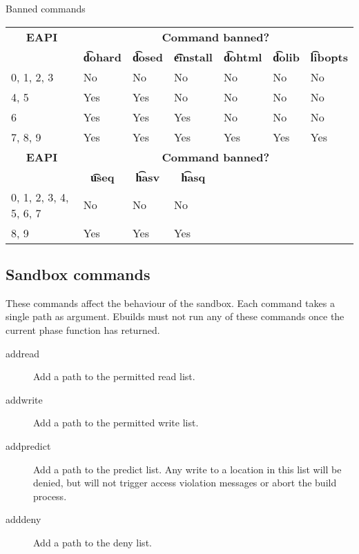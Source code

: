 \begin{centertable}{Banned commands}
    \label{tab:banned-commands-table}
    \begin{tabular}{lllllll}
      \toprule
      \multicolumn{1}{c}{\textbf{EAPI}} &
      \multicolumn{6}{c}{\textbf{Command banned?}} \\
      \multicolumn{1}{c}{} &
      \multicolumn{1}{c}{\textbf{\t{dohard}}} &
      \multicolumn{1}{c}{\textbf{\t{dosed}}} &
      \multicolumn{1}{c}{\textbf{\t{einstall}}} &
      \multicolumn{1}{c}{\textbf{\t{dohtml}}} &
      \multicolumn{1}{c}{\textbf{\t{dolib}}} &
      \multicolumn{1}{c}{\textbf{\t{libopts}}} \\
      \midrule
      0, 1, 2, 3        & No  & No  & No  & No  & No  & No  \\
      4, 5              & Yes & Yes & No  & No  & No  & No  \\
      6                 & Yes & Yes & Yes & No  & No  & No  \\
      7, 8, 9           & Yes & Yes & Yes & Yes & Yes & Yes \\
      \midrule
      \multicolumn{1}{c}{\textbf{EAPI}} &
      \multicolumn{6}{c}{\textbf{Command banned?}} \\
      \multicolumn{1}{c}{} &
      \multicolumn{1}{c}{\textbf{\t{useq}}} &
      \multicolumn{1}{c}{\textbf{\t{hasv}}} &
      \multicolumn{1}{c}{\textbf{\t{hasq}}} & & & \\
      \midrule
      0, 1, 2, 3, 4, 5, 6, 7  & No  & No  & No  & & & \\
      8, 9                    & Yes & Yes & Yes & & & \\
      \bottomrule
    \end{tabular}
\end{centertable}

\subsection{Sandbox commands}
These commands affect the behaviour of the sandbox. Each command takes a single path as argument.
Ebuilds must not run any of these commands once the current phase function has returned.
\begin{description}
\item[addread] Add a path to the permitted read list.
\item[addwrite] Add a path to the permitted write list.
\item[addpredict] Add a path to the predict list. Any write to a location in this list will be
    denied, but will not trigger access violation messages or abort the build process.
\item[adddeny] Add a path to the deny list.
\end{description}

